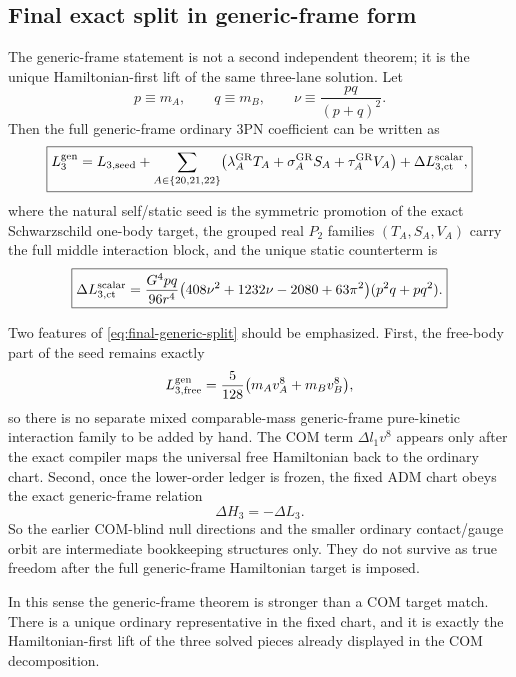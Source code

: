 \documentclass[11pt]{article}
\begin{document}
\subsection{Final exact split in generic-frame form}
\label{sec:final-generic}

The generic-frame statement is not a second independent theorem; it is the unique
Hamiltonian-first lift of the same three-lane solution.  Let
\[
p\equiv m_A,
\qquad
q\equiv m_B,
\qquad
\nu\equiv\frac{pq}{(p+q)^2}.
\]
Then the full generic-frame ordinary $3$PN coefficient can be written as
\begin{equation}
\boxed{
L_3^{\rm gen}
=
L_{3,\rm seed}
+
\sum_{A\in\{20,21,22\}}
\bigl(
\lambda_A^{\rm GR}T_A+\sigma_A^{\rm GR}S_A+\tau_A^{\rm GR}V_A
\bigr)
+
\Delta L_{3,\rm ct}^{\rm scalar},
}
\label{eq:final-generic-split}
\end{equation}
where the natural self/static seed is the symmetric promotion of the exact
Schwarzschild one-body target, the grouped real $P_2$ families
\((T_A,S_A,V_A)\) carry the full middle interaction block, and the unique static
counterterm is
\begin{equation}
\boxed{
\Delta L_{3,\rm ct}^{\rm scalar}
=
\frac{G^4pq}{96r^4}
\bigl(408\nu^2+1232\nu-2080+63\pi^2\bigr)(p^2q+pq^2).
}
\label{eq:final-generic-static}
\end{equation}

Two features of \eqref{eq:final-generic-split} should be emphasized.  First, the
free-body part of the seed remains exactly
\[
L_{3,\rm free}^{\rm gen}
=
\frac{5}{128}\bigl(m_Av_A^8+m_Bv_B^8\bigr),
\]
so there is no separate mixed comparable-mass generic-frame pure-kinetic
interaction family to be added by hand.  The COM term \(\Delta l_1v^8\) appears
only after the exact compiler maps the universal free Hamiltonian back to the
ordinary chart.  Second, once the lower-order ledger is frozen, the fixed ADM
chart obeys the exact generic-frame relation
\begin{equation}
\boxed{\Delta H_3=-\Delta L_3.}
\label{eq:final-sign-flip}
\end{equation}
So the earlier COM-blind null directions and the smaller ordinary contact/gauge
orbit are intermediate bookkeeping structures only.  They do not survive as true
freedom after the full generic-frame Hamiltonian target is imposed.

In this sense the generic-frame theorem is stronger than a COM target match.
There is a unique ordinary representative in the fixed chart, and it is exactly
the Hamiltonian-first lift of the three solved pieces already displayed in the
COM decomposition.
\end{document}
